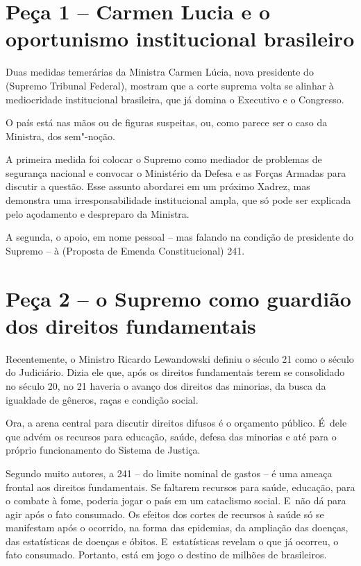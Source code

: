  

\section{Peça 1 -- Carmen Lucia e o oportunismo institucional
brasileiro}

Duas medidas temerárias da Ministra Carmen Lúcia, nova presidente do 
(Supremo Tribunal Federal), mostram que a corte suprema volta se alinhar
à mediocridade institucional brasileira, que já domina o Executivo e o
Congresso.

O país está nas mãos ou de figuras suspeitas, ou, como parece ser o caso
da Ministra, dos sem"-noção.

A primeira medida foi colocar o Supremo como mediador de problemas de
segurança nacional e convocar o Ministério da Defesa e as Forças Armadas
para discutir a questão. Esse assunto abordarei em um próximo Xadrez,
mas demonstra uma irresponsabilidade institucional ampla, que só pode
ser explicada pelo açodamento e despreparo da Ministra.

A segunda, o apoio, em nome pessoal -- mas falando na condição de
presidente do Supremo -- à  (Proposta de Emenda Constitucional) 241.

\section{Peça 2 -- o Supremo como guardião dos direitos fundamentais}

Recentemente, o Ministro Ricardo Lewandowski definiu o século 21 como o
século do Judiciário. Dizia ele que, após os direitos fundamentais terem
se consolidado no século 20, no 21 haveria o avanço dos direitos das
minorias, da busca da igualdade de gêneros, raças e condição social.

Ora, a arena central para discutir direitos difusos é o orçamento
público. É~dele que advém os recursos para educação, saúde, defesa das
minorias e até para o próprio funcionamento do Sistema de Justiça.

Segundo muito autores, a  241 -- do limite nominal de gastos -- é uma
ameaça frontal aos direitos fundamentais. Se faltarem recursos para
saúde, educação, para o combate à fome, poderia jogar o país em um
cataclismo social. E~não dá para agir após o fato consumado. Os efeitos
dos cortes de recursos à saúde só se manifestam após o ocorrido, na
forma das epidemias, da ampliação das doenças, das estatísticas de
doenças e óbitos. E~estatísticas revelam o que já ocorreu, o fato
consumado. Portanto, está em jogo o destino de milhões de brasileiros.

